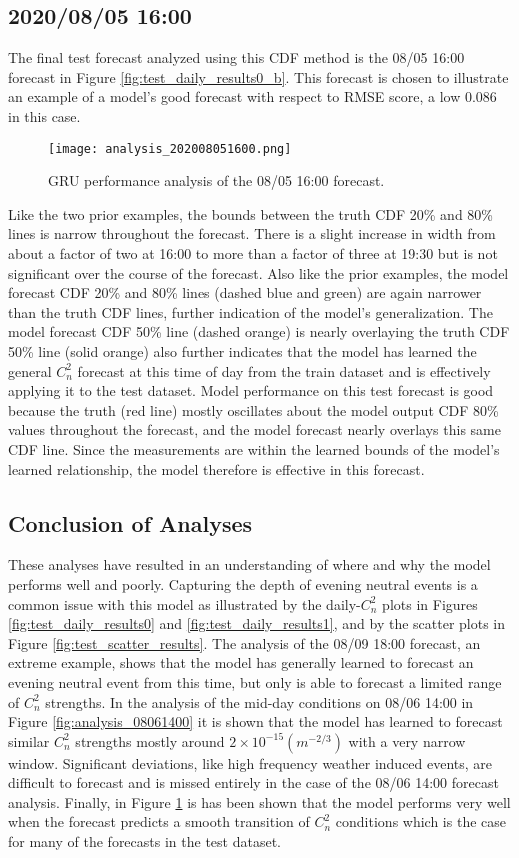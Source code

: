 \subsection{2020/08/05 16:00}
The final test forecast analyzed using this CDF method is the 08/05 16:00 forecast in Figure \ref{fig:test_daily_results0_b}. This forecast is chosen to illustrate an example of a model's good forecast with respect to RMSE score, a low 0.086 in this case.
\begin{figure}[h!]
	\centering
	\texttt{[image: analysis\_202008051600.png]}
	\caption{GRU performance analysis of the 08/05 16:00 forecast.}
	\label{fig:analysis_08051600}
\end{figure}
Like the two prior examples, the bounds between the truth CDF 20\% and 80\% lines is narrow throughout the forecast. There is a slight increase in width from about a factor of two at 16:00 to more than a factor of three at 19:30 but is not significant over the course of the forecast. Also like the prior examples, the model forecast CDF 20\% and 80\% lines (dashed blue and green) are again narrower than the truth CDF lines, further indication of the model's generalization. The model forecast CDF 50\% line (dashed orange) is nearly overlaying the truth CDF 50\% line (solid orange) also further indicates that the model has learned the general $C_{n}^{2}$ forecast at this time of day from the train dataset and is effectively applying it to the test dataset. Model performance on this test forecast is good because the truth (red line) mostly oscillates about the model output CDF 80\% values throughout the forecast, and the model forecast nearly overlays this same CDF line. Since the measurements are within the learned bounds of the model's learned relationship, the model therefore is effective in this forecast.

\subsection{Conclusion of Analyses}
These analyses have resulted in an understanding of where and why the model performs well and poorly. Capturing the depth of evening neutral events is a common issue with this model as illustrated by the daily-$C_{n}^{2}$ plots in Figures \ref{fig:test_daily_results0} and \ref{fig:test_daily_results1}, and by the scatter plots in Figure \ref{fig:test_scatter_results}. The analysis of the 08/09 18:00 forecast, an extreme example, shows that the model has generally learned to forecast an evening neutral event from this time, but only is able to forecast a limited range of $C_{n}^{2}$ strengths. In the analysis of the mid-day conditions on 08/06 14:00 in Figure \ref{fig:analysis_08061400} it is shown that the model has learned to forecast similar $C_{n}^{2}$ strengths mostly around $2 \times 10^{-15} (m^{-2/3})$ with a very narrow window. Significant deviations, like high frequency weather induced events, are difficult to forecast and is missed entirely in the case of the 08/06 14:00 forecast analysis. Finally, in Figure \ref{fig:analysis_08051600} is has been shown that the model performs very well when the forecast predicts a smooth transition of $C_{n}^{2}$ conditions which is the case for many of the forecasts in the test dataset. 